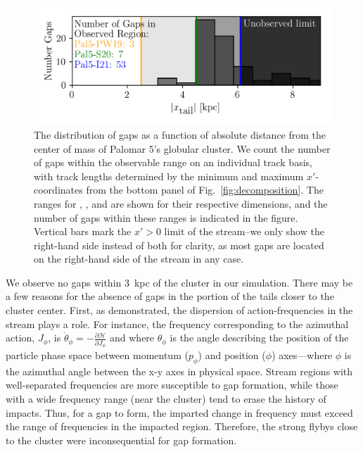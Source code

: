 \documentclass{aa}
\begin{document}
      \begin{figure}
        \centering
        \includegraphics[width=\linewidth]{GapWithinSight.png}
        \caption{The distribution of gaps as a function of absolute distance from the center of mass of Palomar 5's globular cluster. We count the number of gaps within the observable range on an individual track basis, with track lengths determined by the minimum and maximum $x'$-coordinates from the bottom panel of Fig.~\ref{fig:decomposition}. The ranges for \citet{2019AJ....158..223P}, \citet{2020MNRAS.495.2222S}, and \citet{2021ApJ...914..123I} are shown for their respective dimensions, and the number of gaps within these ranges is indicated in the figure. Vertical bars mark the $x' > 0$ limit of the stream--we only show the right-hand side instead of both for clarity, as most gaps are located on the right-hand side of the stream in any case. }
        \label{fig:GapsWithinSight}
      \end{figure}    
    
    We observe no gaps within 3~kpc of the cluster in our simulation. There may be a few reasons for the absence of gaps in the portion of the tails closer to the cluster center. First, as \citet{2016MNRAS.457.3817S} demonstrated, the dispersion of action-frequencies in the stream plays a role. For instance, the frequency corresponding to the azimuthal action, $J_\phi$, is $\dot\theta_\phi = - \frac{\mathcal{\partial H}}{\partial J_\phi}$ and where $\theta_\phi$ is the angle describing the position of the particle phase space between momentum ($p_\phi$) and position ($\phi$) axes---where $\phi$ is the azimuthal angle between the x-y axes in physical space. Stream regions with well-separated frequencies are more susceptible to gap formation, while those with a wide frequency range (near the cluster) tend to erase the history of impacts. Thus, for a gap to form, the imparted change in frequency must exceed the range of frequencies in the impacted region. Therefore, the strong flybys close to the cluster were inconsequential for gap formation. 
    
\end{document}
